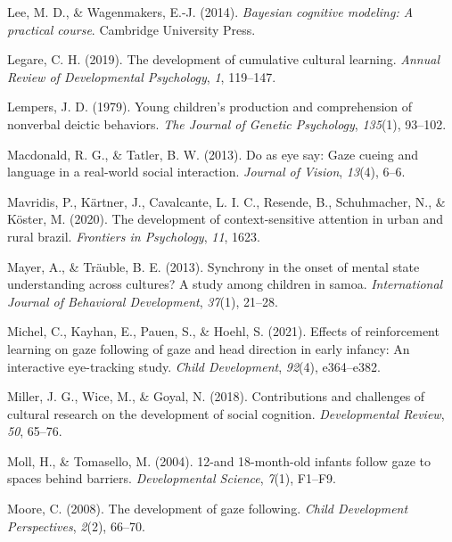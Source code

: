 \documentclass[
  man,floatsintext]{apa7}
\newlength{\cslhangindent}
\newlength{\cslentryspacingunit} %
\newenvironment{CSLReferences}[2] %
 {%
  \setlength{\parindent}{0pt}
  \ifodd #1
  \let\oldpar\par
  \def\par{\hangindent=\cslhangindent\oldpar}
  \fi
  \setlength{\parskip}{#2\cslentryspacingunit}
 }%
 {}
\begin{document}
\begin{CSLReferences}{1}{0}
\leavevmode{}%
Lee, M. D., \& Wagenmakers, E.-J. (2014). \emph{Bayesian cognitive modeling: A practical course}. Cambridge University Press.

\leavevmode{}%
Legare, C. H. (2019). The development of cumulative cultural learning. \emph{Annual Review of Developmental Psychology}, \emph{1}, 119--147.

\leavevmode{}%
Lempers, J. D. (1979). Young children's production and comprehension of nonverbal deictic behaviors. \emph{The Journal of Genetic Psychology}, \emph{135}(1), 93--102.

\leavevmode{}%
Macdonald, R. G., \& Tatler, B. W. (2013). Do as eye say: Gaze cueing and language in a real-world social interaction. \emph{Journal of Vision}, \emph{13}(4), 6--6.

\leavevmode{}%
Mavridis, P., Kärtner, J., Cavalcante, L. I. C., Resende, B., Schuhmacher, N., \& Köster, M. (2020). The development of context-sensitive attention in urban and rural brazil. \emph{Frontiers in Psychology}, \emph{11}, 1623.

\leavevmode{}%
Mayer, A., \& Träuble, B. E. (2013). Synchrony in the onset of mental state understanding across cultures? A study among children in samoa. \emph{International Journal of Behavioral Development}, \emph{37}(1), 21--28.

\leavevmode{}%
Michel, C., Kayhan, E., Pauen, S., \& Hoehl, S. (2021). Effects of reinforcement learning on gaze following of gaze and head direction in early infancy: An interactive eye-tracking study. \emph{Child Development}, \emph{92}(4), e364--e382.

\leavevmode{}%
Miller, J. G., Wice, M., \& Goyal, N. (2018). Contributions and challenges of cultural research on the development of social cognition. \emph{Developmental Review}, \emph{50}, 65--76.

\leavevmode{}%
Moll, H., \& Tomasello, M. (2004). 12-and 18-month-old infants follow gaze to spaces behind barriers. \emph{Developmental Science}, \emph{7}(1), F1--F9.

\leavevmode{}%
Moore, C. (2008). The development of gaze following. \emph{Child Development Perspectives}, \emph{2}(2), 66--70.


\end{CSLReferences}
\end{document}
